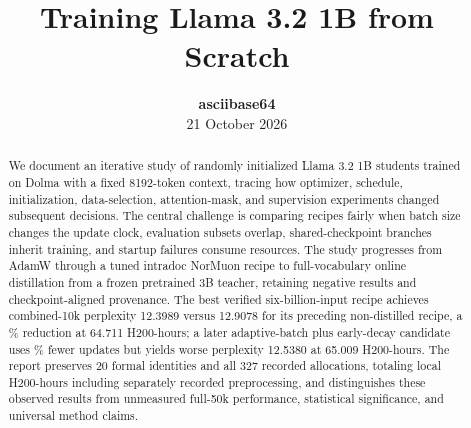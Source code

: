 \documentclass{article}
\title{Training Llama 3.2 1B from Scratch}
\author{\textbf{asciibase64}\\21 October 2026}
\begin{document}
\raggedbottom
\maketitle

\begin{abstract}
We document an iterative study of randomly initialized Llama 3.2 1B students trained on Dolma with a fixed 8192-token context, tracing how optimizer, schedule, initialization, data-selection, attention-mask, and supervision experiments changed subsequent decisions.
The central challenge is comparing recipes fairly when batch size changes the update clock, evaluation subsets overlap, shared-checkpoint branches inherit training, and startup failures consume resources.
The study progresses from AdamW through a tuned intradoc NorMuon recipe to full-vocabulary online distillation from a frozen pretrained 3B teacher, retaining negative results and checkpoint-aligned provenance.
The best verified six-billion-input recipe achieves combined-10k perplexity 12.3989 versus 12.9078 for its preceding non-distilled recipe, a \KDImprovement\% reduction at 64.711 H200-hours; a later adaptive-batch plus early-decay candidate uses \CtwoUpdateReduction\% fewer updates but yields worse perplexity 12.5380 at 65.009 H200-hours.
The report preserves 20 formal identities and all 327 recorded allocations, totaling \CombinedHours{} local H200-hours including separately recorded preprocessing, and distinguishes these observed results from unmeasured full-50k performance, statistical significance, and universal method claims.
\end{abstract}

\FloatBarrier


\clearpage

\FloatBarrier
\end{document}
